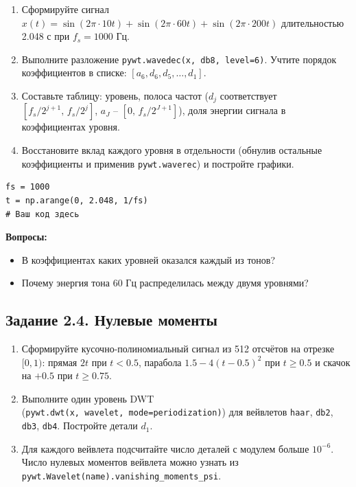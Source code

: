 \documentclass[12pt,a4paper,openany]{book}
\providecommand{\tightlist}{\setlength{\itemsep}{0pt}\setlength{\parskip}{0pt}}
\begin{document}
\begin{enumerate}
\def\labelenumi{\arabic{enumi}.}
\tightlist
\item
  Сформируйте сигнал \(x(t) = \sin(2\pi\cdot 10t) + \sin(2\pi\cdot 60t) + \sin(2\pi\cdot 200t)\) длительностью 2.048 с при \(f_s = 1000\) Гц.
\item
  Выполните разложение \texttt{pywt.\allowbreak{}wavedec(\allowbreak{}x,\allowbreak{}\ \textquotesingle{}\allowbreak{}db8\textquotesingle{}\allowbreak{},\allowbreak{}\ level=\allowbreak{}6)}. Учтите порядок коэффициентов в списке: \([a_6, d_6, d_5, \dots, d_1]\).
\item
  Составьте таблицу: уровень, полоса частот (\(d_j\) соответствует \([f_s/2^{j+1},\, f_s/2^j]\), \(a_J\) -- \([0,\, f_s/2^{J+1}]\)), доля энергии сигнала в коэффициентах уровня.
\item
  Восстановите вклад каждого уровня в отдельности (обнулив остальные коэффициенты и применив \texttt{pywt.\allowbreak{}waverec}) и постройте графики.
\end{enumerate}

\begin{Verbatim}[fontsize=\small, breaklines, breakanywhere, frame=single, framesep=2mm]
fs = 1000
t = np.arange(0, 2.048, 1/fs)
# Ваш код здесь
\end{Verbatim}

\textbf{Вопросы:}

\begin{itemize}
\tightlist
\item
  В коэффициентах каких уровней оказался каждый из тонов?
\item
  Почему энергия тона 60 Гц распределилась между двумя уровнями?
\end{itemize}

\subsection*{Задание 2.4. Нулевые моменты}

\begin{enumerate}
\def\labelenumi{\arabic{enumi}.}
\tightlist
\item
  Сформируйте кусочно-полиномиальный сигнал из 512 отсчётов на отрезке \([0, 1)\): прямая \(2t\) при \(t < 0.5\), парабола \(1.5 - 4(t - 0.5)^2\) при \(t \ge 0.5\) и скачок на \(+0.5\) при \(t \ge 0.75\).
\item
  Выполните один уровень DWT (\texttt{pywt.\allowbreak{}dwt(\allowbreak{}x,\allowbreak{}\ wavelet,\allowbreak{}\ mode=\allowbreak{}\textquotesingle{}\allowbreak{}periodization\textquotesingle{}\allowbreak{})}) для вейвлетов \texttt{haar}, \texttt{db2}, \texttt{db3}, \texttt{db4}. Постройте детали \(d_1\).
\item
  Для каждого вейвлета подсчитайте число деталей с модулем больше \(10^{-6}\). Число нулевых моментов вейвлета можно узнать из \texttt{pywt.\allowbreak{}Wavelet(\allowbreak{}name).\allowbreak{}vanishing\_\allowbreak{}moments\_\allowbreak{}psi}.
\end{enumerate}
\end{document}
